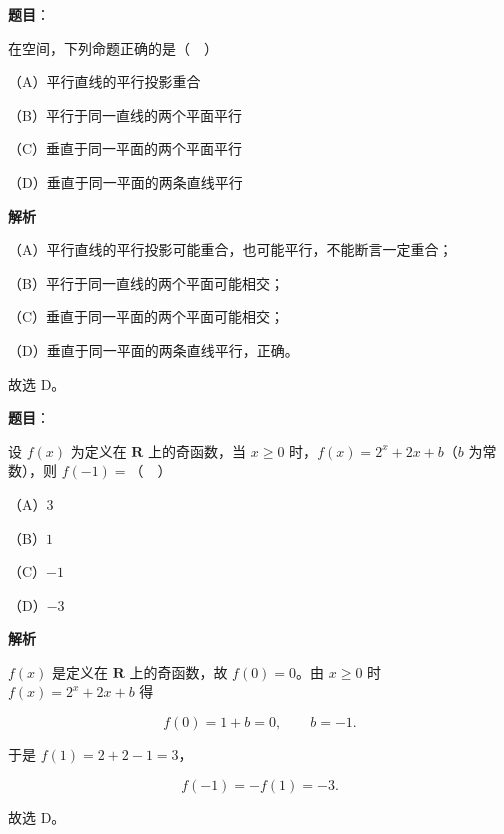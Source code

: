 \begin{answer}

\textbf{题目}：

在空间，下列命题正确的是（　）

（A）平行直线的平行投影重合

（B）平行于同一直线的两个平面平行

（C）垂直于同一平面的两个平面平行

（D）垂直于同一平面的两条直线平行

\textbf{解析}

（A）平行直线的平行投影可能重合，也可能平行，不能断言一定重合；

（B）平行于同一直线的两个平面可能相交；

（C）垂直于同一平面的两个平面可能相交；

（D）垂直于同一平面的两条直线平行，正确。

故选 D。


\end{answer}
\begin{answer}

\textbf{题目}：

设 $f(x)$ 为定义在 $\mathbf R$ 上的奇函数，当 $x\geqslant0$ 时，$f(x)=2^x+2x+b$（$b$ 为常数），则 $f(-1)=$（　）

（A）$3$

（B）$1$

（C）$-1$

（D）$-3$

\textbf{解析}

$f(x)$ 是定义在 $\mathbf R$ 上的奇函数，故 $f(0)=0$。由 $x\geqslant0$ 时 $f(x)=2^x+2x+b$ 得

\nopagebreak[4]
\[f(0)=1+b=0,\qquad b=-1.\]

于是 $f(1)=2+2-1=3$，

\nopagebreak[4]
\[f(-1)=-f(1)=-3.\]

故选 D。


\end{answer}
